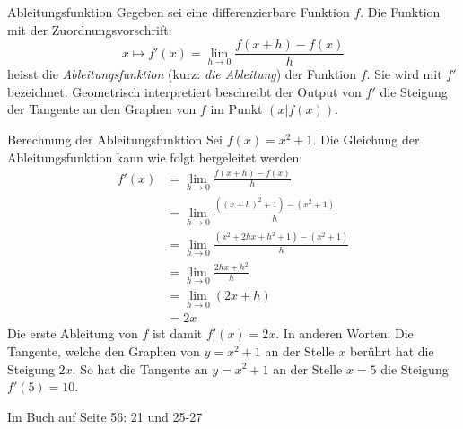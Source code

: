 \begin{definition}
    {Ableitungsfunktion}{}
    Gegeben sei eine differenzierbare Funktion $f$. Die Funktion mit der Zuordnungsvorschrift:
    $$x\mapsto f'(x)=\lim_{h\rightarrow0}\frac{f(x+h)-f(x)}{h}$$
    heisst die \emph{Ableitungsfunktion} (kurz: \emph{die Ableitung}) der Funktion $f$. Sie wird mit $f'$ bezeichnet. 
    \newline
    Geometrisch interpretiert beschreibt der Output von $f'$ die Steigung der Tangente an den Graphen von $f$ im Punkt $(x|f(x))$.
  
\end{definition}

\begin{bsp}
    {Berechnung der Ableitungsfunktion}{}
    Sei $f(x)=x^2+1$. Die Gleichung der Ableitungsfunktion kann wie folgt hergeleitet werden:
    \begin{align*}
        f'(x)   &= \lim_{h\rightarrow0}\frac{f(x+h)-f(x)}{h}\\
                &=  \lim_{h\rightarrow0}\frac{\left((x+h)^2+1\right)-\left(x^2+1\right)}{h}\\
                &= \lim_{h\rightarrow0}\frac{\left(x^2+2hx+h^2+1\right)-\left(x^2+1\right)}{h}\\
                &= \lim_{h\rightarrow0}\frac{2hx+h^2}{h}\\
                &= \lim_{h\rightarrow0}\left(2x+h\right)\\
                &= 2x
    \end{align*}
    Die erste Ableitung von $f$ ist damit $f'(x)=2x$. In anderen Worten: Die Tangente, welche den Graphen von $y=x^2+1$ an der Stelle $x$ berührt hat die Steigung $2x$.
    So hat die Tangente an $y=x^2+1$ an der Stelle $x=5$ die Steigung $f'(5)=10$.
    
\end{bsp}
\begin{ueb}
    {}{}
    Im Buch auf Seite 56: 21 und 25-27
\end{ueb}

